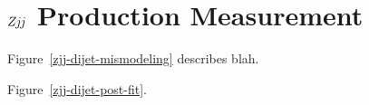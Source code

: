 \documentclass{PoS}
\def\zjj{\ensuremath{Z\kern -0.1em j\kern -0.1emj}\xspace}
\begin{document}




\section{\zjj Production Measurement}

Figure~\ref{zjj-dijet-mismodeling} describes blah.


Figure~\ref{zjj-dijet-post-fit}.
\end{document}
